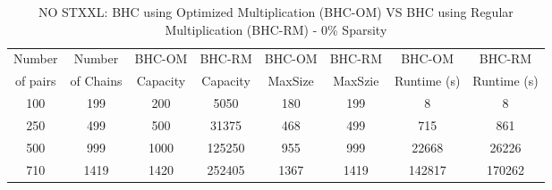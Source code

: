 \documentclass[11pt, one-sided]{amsart}
\begin{document}
\begin{table}[htbp]
   \centering
      \caption{NO STXXL: BHC using Optimized Multiplication (BHC-OM) VS BHC using Regular Multiplication (BHC-RM) - 0\% Sparsity} 
   \begin{tabular}{|c|c|c|c|c|c|c|c|}
   	\hline
		 Number   & Number    & BHC-OM & BHC-RM& BHC-OM & BHC-RM & BHC-OM    & BHC-RM 		 \\ 
		 of pairs 	& of Chains &Capacity & Capacity & MaxSize & MaxSzie & Runtime (s)& Runtime (s)		\\ \hline
		 100		& 199 	   & 200	    & 5050	      &	180	      &	199	       &	8	       &	8			\\
		 250		& 499   	   & 500   	    & 31375     & 468	      & 499	       &       715	       &	 861			\\
		 500		& 999	   &1000	   &125250     &	955	      &	999         &	      22668        &	26226		\\
		 710		& 1419	   &1420	   &252405     &	1367	      &	1419	       & 142817          &		170262		\\
	\hline
   \end{tabular}
   \label{tab:booktabs}
\end{table}
\end{document}
